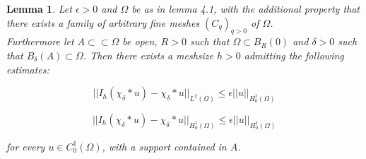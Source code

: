 \documentclass[11pt,a4paper,leqno]{report}
\newtheorem{lemma}[theorem]{Lemma}
\numberwithin{equation}{chapter}
\begin{document}
\begin{lemma} Let $\epsilon>0$ and $\Omega$ be as in lemma 4.1, with the additional property that there exists a family of arbitrary fine meshes $(C_q)_{q>0}$ of $\Omega$. \\Furthermore let $A\subset\subset\Omega$ be open, $R>0$ such that $\Omega\subset B_R(0)$ and $\delta>0$ such that $B_\delta(A)\subset\Omega$. 
Then there exists a meshsize $h>0$ admitting the following estimates:
\begin{small}\begin{equation} ||I_h(\chi_\delta*u)-\chi_\delta*u||_{L^2(\Omega)}\leq \epsilon||u||_{H^1_0(\Omega)}\end{equation}\end{small}
\begin{small}\begin{equation} ||I_h(\chi_\delta*u)-\chi_\delta*u||_{H^1_0(\Omega)}\leq \epsilon||u||_{H^1_0(\Omega)}\end{equation}\end{small}
for every $u\in C^1_0(\Omega)$, with a support contained in $A$.
\end{lemma}
\end{document}
